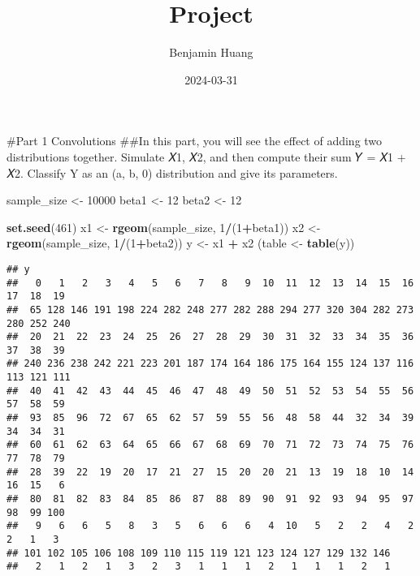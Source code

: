 \documentclass[
]{article}
\title{Project}
\author{Benjamin Huang}
\date{2024-03-31}
\newenvironment{Shaded}{\begin{snugshade}}{\end{snugshade}}
\newcommand{\DecValTok}[1]{\textcolor[rgb]{0.00,0.00,0.81}{#1}}
\newcommand{\FunctionTok}[1]{\textcolor[rgb]{0.13,0.29,0.53}{\textbf{#1}}}
\newcommand{\NormalTok}[1]{#1}
\newcommand{\OtherTok}[1]{\textcolor[rgb]{0.56,0.35,0.01}{#1}}
\newcommand{\SpecialCharTok}[1]{\textcolor[rgb]{0.81,0.36,0.00}{\textbf{#1}}}
\begin{document}
\maketitle

\#Part 1 Convolutions \#\#In this part, you will see the effect of
adding two distributions together. Simulate 𝑋1, 𝑋2, and then compute
their sum 𝑌 = 𝑋1 + 𝑋2. Classify Y as an (a, b, 0) distribution and give
its parameters.

\begin{Shaded}
\begin{Highlighting}[]
\NormalTok{sample\_size }\OtherTok{\textless{}{-}} \DecValTok{10000}
\NormalTok{beta1 }\OtherTok{\textless{}{-}} \DecValTok{12}
\NormalTok{beta2 }\OtherTok{\textless{}{-}} \DecValTok{12}

\FunctionTok{set.seed}\NormalTok{(}\DecValTok{461}\NormalTok{)}
\NormalTok{x1 }\OtherTok{\textless{}{-}} \FunctionTok{rgeom}\NormalTok{(sample\_size, }\DecValTok{1}\SpecialCharTok{/}\NormalTok{(}\DecValTok{1}\SpecialCharTok{+}\NormalTok{beta1))}
\NormalTok{x2 }\OtherTok{\textless{}{-}} \FunctionTok{rgeom}\NormalTok{(sample\_size, }\DecValTok{1}\SpecialCharTok{/}\NormalTok{(}\DecValTok{1}\SpecialCharTok{+}\NormalTok{beta2))}
\NormalTok{y }\OtherTok{\textless{}{-}}\NormalTok{ x1 }\SpecialCharTok{+}\NormalTok{ x2}
\NormalTok{(table }\OtherTok{\textless{}{-}} \FunctionTok{table}\NormalTok{(y))}
\end{Highlighting}
\end{Shaded}

\begin{verbatim}
## y
##   0   1   2   3   4   5   6   7   8   9  10  11  12  13  14  15  16  17  18  19 
##  65 128 146 191 198 224 282 248 277 282 288 294 277 320 304 282 273 280 252 240 
##  20  21  22  23  24  25  26  27  28  29  30  31  32  33  34  35  36  37  38  39 
## 240 236 238 242 221 223 201 187 174 164 186 175 164 155 124 137 116 113 121 111 
##  40  41  42  43  44  45  46  47  48  49  50  51  52  53  54  55  56  57  58  59 
##  93  85  96  72  67  65  62  57  59  55  56  48  58  44  32  34  39  34  34  31 
##  60  61  62  63  64  65  66  67  68  69  70  71  72  73  74  75  76  77  78  79 
##  28  39  22  19  20  17  21  27  15  20  20  21  13  19  18  10  14  16  15   6 
##  80  81  82  83  84  85  86  87  88  89  90  91  92  93  94  95  97  98  99 100 
##   9   6   6   5   8   3   5   6   6   6   4  10   5   2   2   4   2   2   1   3 
## 101 102 105 106 108 109 110 115 119 121 123 124 127 129 132 146 
##   2   1   2   1   3   2   3   1   1   1   2   1   1   1   2   1
\end{verbatim}
\end{document}
